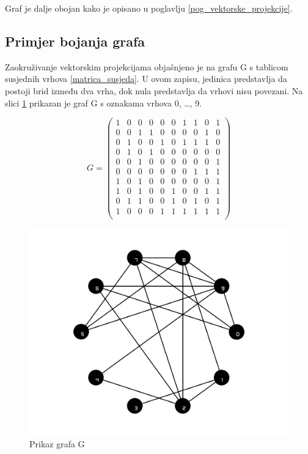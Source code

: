 \documentclass[diplomskirad]{fer}
\begin{document}
Graf je dalje obojan kako je opisano u poglavlju \ref{pog_vektorske_projekcije}.

\subsection{Primjer bojanja grafa}
Zaokruživanje vektorskim projekcijama objašnjeno je na grafu G s tablicom susjednih vrhova \ref{matrica_susjeda}. U ovom zapisu,
jedinica predstavlja da postoji brid između dva vrha, dok nula predstavlja da vrhovi nisu povezani.
Na slici \ref{grafG} prikazan je graf G s oznakama vrhova
0, \dots, 9.

\begin{equation} \label{matrica_susjeda}
   G =\begin{pmatrix}
    1 & 0 & 0 & 0 & 0 & 0 & 1 & 1 & 0 & 1 \\
    0 & 0 & 1 & 1 & 0 & 0 & 0 & 0 & 1 & 0 \\
    0 & 1 & 0 & 0 & 1 & 0 & 1 & 1 & 1 & 0 \\
    0 & 1 & 0 & 1 & 0 & 0 & 0 & 0 & 0 & 0 \\
    0 & 0 & 1 & 0 & 0 & 0 & 0 & 0 & 0 & 1 \\
    0 & 0 & 0 & 0 & 0 & 0 & 0 & 1 & 1 & 1 \\
    1 & 0 & 1 & 0 & 0 & 0 & 0 & 0 & 0 & 1 \\
    1 & 0 & 1 & 0 & 0 & 1 & 0 & 0 & 1 & 1 \\
    0 & 1 & 1 & 0 & 0 & 1 & 0 & 1 & 0 & 1 \\
    1 & 0 & 0 & 0 & 1 & 1 & 1 & 1 & 1 & 1 \\
  \end{pmatrix}
\end{equation}

\begin{figure}
  \centering
  \includegraphics[scale=0.4]{images/colors_it2.png}
  \caption{Prikaz grafa G}
  \label{grafG}
\end{figure}
\end{document}
